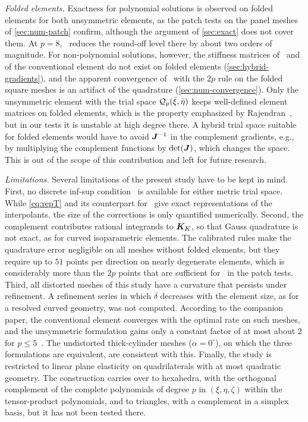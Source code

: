 \emph{Folded elements.} Exactness for polynomial solutions is observed on folded elements for both unsymmetric elements, as the patch tests on the panel meshes of \cref{sec:num-patch} confirm, although the argument of \cref{sec:exact} does not cover them. At $p=8$, \PH\ reduces the round-off level there by about two orders of magnitude. For non-polynomial solutions, however, the stiffness matrices of \PH\ and of the conventional element do not exist on folded elements (\cref{sec:hybrid-gradients}), and the apparent convergence of \PH\ with the $2p$ rule on the folded square meshes is an artifact of the quadrature (\cref{sec:num-convergence}). Only the unsymmetric element with the trial space $\mathcal Q_p(\bar\xi,\bar\eta)$ keeps well-defined element matrices on folded elements, which is the property emphasized by Rajendran~\cite{Rajendran2010technique}, but in our tests it is unstable at high degree there. A hybrid trial space suitable for folded elements would have to avoid $\bm{J}^{-1}$ in the complement gradients, e.g., by multiplying the complement functions by $\det(\bm{J})$, which changes the space. This is out of the scope of this contribution and left for future research.

\emph{Limitations.} Several limitations of the present study have to be kept in mind. First, no discrete inf-sup condition~\cite{Babuska1971Error} is available for either metric trial space. While \cref{eq:repT} and its counterpart for \PM\ give exact representations of the interpolants, the size of the corrections is only quantified numerically. Second, the complement contributes rational integrands to $\bm{K}_K$, so that Gauss quadrature is not exact, as for curved isoparametric elements. The calibrated rules make the quadrature error negligible on all meshes without folded elements, but they require up to $51$ points per direction on nearly degenerate elements, which is considerably more than the $2p$ points that are sufficient for \PM\ in the patch tests. Third, all distorted meshes of this study have a curvature that persists under refinement. A refinement series in which $\delta$ decreases with the element size, as for a resolved curved geometry, was not computed. According to the companion paper, the conventional element converges with the optimal rate on such meshes, and the unsymmetric formulation gains only a constant factor of at most about 2 for $p\le5$~\cite{Eisentraeger2026axisymmetric}. The undistorted thick-cylinder meshes ($\alpha=0^\circ$), on which the three formulations are equivalent, are consistent with this. Finally, the study is restricted to linear plane elasticity on quadrilaterals with at most quadratic geometry. The construction carries over to hexahedra, with the orthogonal complement of the complete polynomials of degree $p$ in $(\xi,\eta,\zeta)$ within the tensor-product polynomials, and to triangles, with a complement in a simplex basis, but it has not been tested there.
